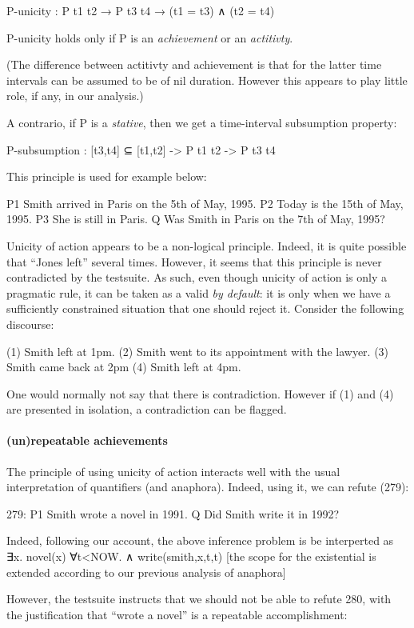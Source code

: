 \documentclass[a4paper,11pt]{article}
\begin{document}
P-unicity : P t1 t2 → P t3 t4 → (t1 = t3) ∧ (t2 = t4)

P-unicity holds only if P is an \emph{achievement} or an \emph{actitivty}.

(The difference between actitivty and achievement is that for the
latter time intervals can be assumed to be of nil duration. However
this appears to play little role, if any, in our analysis.)

A contrario, if P is a \emph{stative}, then we get a time-interval subsumption property:

P-subsumption : [t3,t4] ⊆ [t1,t2] -> P t1 t2 -> P t3 t4

This principle is used for example below:

P1	Smith arrived in Paris on the 5th of May, 1995.
P2	Today is the 15th of May, 1995.
P3	She is still in Paris.
Q 	Was Smith in Paris on the 7th of May, 1995? 

Unicity of action appears to be a non-logical principle. Indeed, it is
quite possible that ``Jones left'' several times. However, it seems
that this principle is never contradicted by the testsuite. As such,
even though unicity of action is only a pragmatic rule, it can be
taken as a valid \emph{by default}: it is only when we have a
sufficiently constrained situation that one should reject it. Consider
the following discourse:

(1) Smith left at 1pm.
(2) Smith went to its appointment with the lawyer.
(3) Smith came back at 2pm
(4) Smith left at 4pm.

One would normally not say that there is contradiction. However if (1)
and (4) are presented in isolation, a contradiction can be flagged.

\paragraph{(un)repeatable achievements}
The principle of using unicity of action interacts well with the usual interpretation of quantifiers (and anaphora).
Indeed, using it, we can refute (279):

279:
P1	Smith wrote a novel in 1991.
Q 	Did Smith write it in 1992?

Indeed, following our account, the above inference problem is be
interperted as ∃x. novel(x) ∀t<NOW.  ∧ write(smith,x,t,t) [the scope
for the existential is extended according to our previous analysis of
anaphora]

However, the testsuite instructs that we should not be able to refute
280, with the justification that ``wrote a novel'' is a repeatable
accomplishment:
\end{document}
